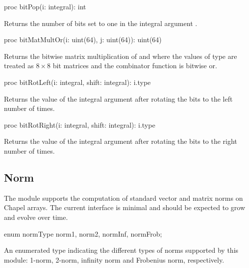 \vspace{1pc}

\begin{protohead}
proc bitPop(i: integral): int
\end{protohead}
\begin{protobody}
Returns the number of bits set to one in the integral
argument .
\end{protobody}

\begin{protohead}
proc bitMatMultOr(i: uint(64), j: uint(64)): uint(64)
\end{protohead}
\begin{protobody}
Returns the bitwise matrix multiplication of  and 
where the values of  type are treated as $8 \times 8$
bit matrices and the combinator function is bitwise or.
\end{protobody}

\begin{protohead}
proc bitRotLeft(i: integral, shift: integral): i.type
\end{protohead}
\begin{protobody}
Returns the value of the integral argument  after rotating the
bits to the left  number of times.
\end{protobody}

\begin{protohead}
proc bitRotRight(i: integral, shift: integral): i.type
\end{protohead}
\begin{protobody}
Returns the value of the integral argument  after rotating the
bits to the right  number of times.
\end{protobody}


\subsection{Norm}
\label{Norm}

The module  supports the computation of standard vector and
matrix norms on Chapel arrays.  The current interface is minimal and
should be expected to grow and evolve over time.

\begin{protohead}
enum normType {norm1, norm2, normInf, normFrob};
\end{protohead}
\begin{protobody}
An enumerated type indicating the different types of norms supported
by this module: 1-norm, 2-norm, infinity norm and Frobenius norm,
respectively.
\end{protobody}


